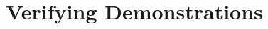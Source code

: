 \title{%
  Verifying Demonstrations
}

\maketitle

\begin{abstract}
  
\end{abstract}

\tableofcontents

\mode*














\printbibliography{}
